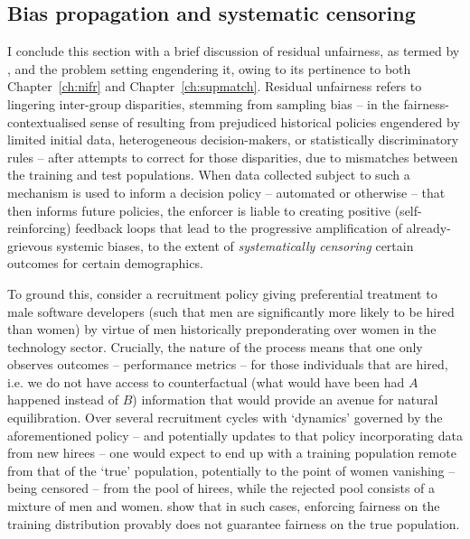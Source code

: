 \subsection{Bias propagation and systematic censoring}\label{ssec:residual-unfairness}
I conclude this section with a brief discussion of residual unfairness, as termed by
\citet{kallus2018residual}, and the problem setting engendering it, owing to its pertinence to both
Chapter~\ref{ch:nifr} and Chapter~\ref{ch:supmatch}.
%
Residual unfairness refers to lingering inter-group disparities, stemming from sampling bias -- in
the fairness-contextualised sense of resulting from prejudiced historical policies engendered by
limited initial data, heterogeneous decision-makers, or statistically discriminatory rules -- after
attempts to correct for those disparities, due to mismatches between the training and test
populations.
%
When data collected subject to such a mechanism is used to inform a decision policy -- automated or
otherwise -- that then informs future policies, the enforcer is liable to creating positive
(self-reinforcing) feedback loops that lead to the progressive amplification of already-grievous
systemic biases, to the extent of \emph{systematically censoring} certain outcomes for certain
demographics.

%
To ground this, consider a recruitment policy giving preferential treatment to male software
developers (such that men are significantly more likely to be hired than women) by virtue of men
historically preponderating over women in the technology sector.
%
Crucially, the nature of the process means that one only observes outcomes -- performance metrics
-- for those individuals that are hired, i.e. we do not have access to counterfactual (what would
have been had \(A\) happened instead of \(B\)) information that would provide an avenue for natural
equilibration.
%
Over several recruitment cycles with `dynamics' governed by the aforementioned policy -- and
potentially updates to that policy incorporating data from new hirees -- one would expect to end up
with a training population remote from that of the `true' population, potentially to the point of
women vanishing -- being censored -- from the pool of hirees, while the rejected pool consists of a
mixture of men and women.
%
\cite{kallus2018residual} show that in such cases, enforcing fairness on the training distribution
provably does not guarantee fairness on the true population.
%


